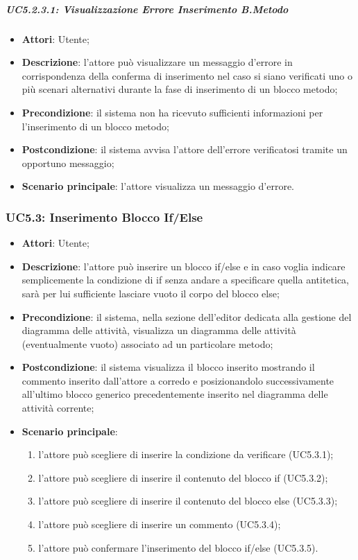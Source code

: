 \subparagraph{UC5.2.3.1: Visualizzazione Errore Inserimento B.Metodo}
\label{UC5.2.3.1}
\begin{itemize}
\item \textbf{Attori}: Utente;
\item \textbf{Descrizione}: l'attore può visualizzare un messaggio d'errore in corrispondenza della conferma di inserimento nel caso si siano verificati uno o più scenari alternativi durante la fase di inserimento di un blocco metodo;	
\item \textbf{Precondizione}: il sistema non ha ricevuto sufficienti informazioni per l'inserimento di un blocco metodo;	
\item \textbf{Postcondizione}: il sistema avvisa l'attore dell'errore verificatosi tramite un opportuno messaggio;	
\item \textbf{Scenario principale}:
l'attore visualizza un messaggio d'errore.	
\end{itemize}

\subsubsection{UC5.3: Inserimento Blocco If/Else}
\label{UC5.3}
\begin{itemize}
\item \textbf{Attori}: Utente;
\item \textbf{Descrizione}: l'attore può inserire un blocco if/else e in caso voglia indicare semplicemente la condizione di if senza andare a specificare quella antitetica, sarà per lui sufficiente lasciare vuoto il corpo del blocco else;	
\item \textbf{Precondizione}: il sistema, nella sezione dell'editor dedicata alla gestione del diagramma delle attività, visualizza un diagramma delle attività (eventualmente vuoto) associato ad un particolare metodo;	
\item \textbf{Postcondizione}: il sistema visualizza il blocco inserito mostrando il commento inserito dall'attore a corredo e posizionandolo successivamente all'ultimo blocco generico precedentemente inserito nel diagramma delle attività corrente;	
\item \textbf{Scenario principale}:
\begin{enumerate}
\item l'attore può scegliere di inserire la condizione da verificare (UC5.3.1);
\item l'attore può scegliere di inserire il contenuto del blocco if (UC5.3.2);
\item l'attore può scegliere di inserire il contenuto del blocco else (UC5.3.3);
\item l'attore può scegliere di inserire un commento (UC5.3.4);
\item l'attore può confermare l'inserimento del blocco if/else (UC5.3.5).
\end{enumerate}
\end{itemize}

